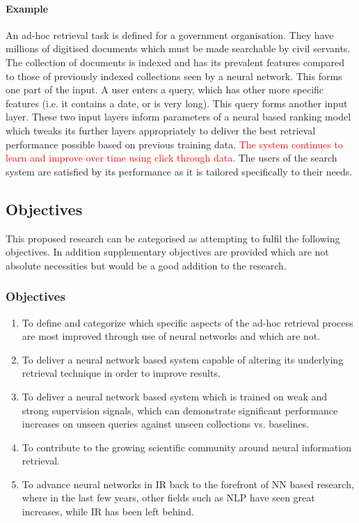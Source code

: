 \documentclass[11pt,english,twocolumn]{article}
\newcommand{\remove}[1]{\textcolor{red}{#1}}
\begin{document}
\paragraph{Example}
An ad-hoc retrieval task is defined for a government organisation. They have millions of digitised documents which must be made searchable by civil servants. 
The collection of documents is indexed and has its prevalent features compared to those of previously indexed collections seen by a neural network. 
This forms one part of the input. 
A user enters a query, which has other more specific features (i.e. it contains a date, or is very long). 
This query forms another input layer. 
These two input layers inform parameters of a neural based ranking model which tweaks its further layers appropriately to deliver the best retrieval performance possible based on previous training data. 
\remove{The system continues to learn and improve over time using click through data.} %
The users of the search system are satisfied by its performance as it is tailored specifically to their needs.

\subsection{Objectives}\label{sec:objectives}
This proposed research can be categorised as attempting to fulfil the following objectives. In addition supplementary objectives are provided which are not absolute necessities but would be a good addition to the research.
\newline
\subsubsection*{Objectives}
\vspace{0.5em}
\begin{enumerate}[label=\textbf{Obj.\arabic*}, wide=\parindent]
\item To define and categorize which specific aspects of the ad-hoc retrieval process are most improved through use of neural networks and which are not.
\item To deliver a neural network based system capable of altering its underlying retrieval technique in order to improve results.
\item To deliver a neural network based system which is trained on weak and strong supervision signals, which can demonstrate significant performance increases on unseen queries against unseen collections vs. baselines.
\item To contribute to the growing scientific community around neural information retrieval.
\item To advance neural networks in IR back to the forefront of NN based research, where in the last few years, other fields such as NLP have seen great increases, while IR has been left behind.
\end{enumerate}
\end{document}
